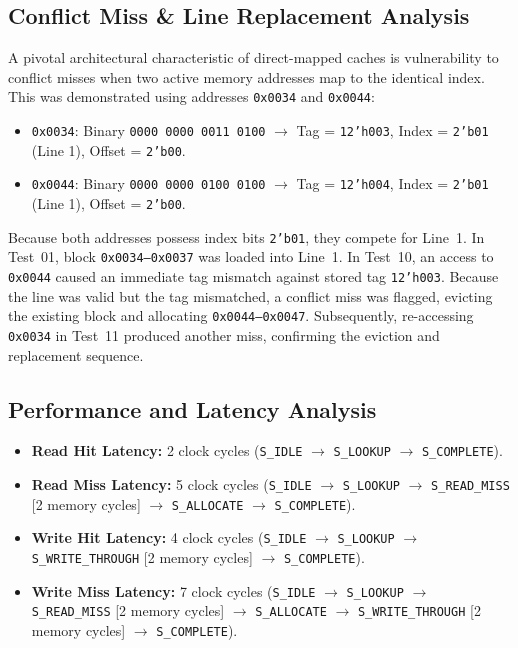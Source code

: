 \documentclass[conference]{IEEEtran}
\begin{document}
\subsection{Conflict Miss \& Line Replacement Analysis}
A pivotal architectural characteristic of direct-mapped caches is vulnerability to conflict misses when two active memory addresses map to the identical index. This was demonstrated using addresses \texttt{0x0034} and \texttt{0x0044}:
\begin{itemize}
    \item \texttt{0x0034}: Binary \texttt{0000 0000 0011 0100} $\rightarrow$ Tag = \texttt{12'h003}, Index = \texttt{2'b01} (Line 1), Offset = \texttt{2'b00}.
    \item \texttt{0x0044}: Binary \texttt{0000 0000 0100 0100} $\rightarrow$ Tag = \texttt{12'h004}, Index = \texttt{2'b01} (Line 1), Offset = \texttt{2'b00}.
\end{itemize}

Because both addresses possess index bits \texttt{2'b01}, they compete for Line~1. In Test~01, block \texttt{0x0034--0x0037} was loaded into Line~1. In Test~10, an access to \texttt{0x0044} caused an immediate tag mismatch against stored tag \texttt{12'h003}. Because the line was valid but the tag mismatched, a conflict miss was flagged, evicting the existing block and allocating \texttt{0x0044--0x0047}. Subsequently, re-accessing \texttt{0x0034} in Test~11 produced another miss, confirming the eviction and replacement sequence.

\subsection{Performance and Latency Analysis}
\begin{itemize}
    \item \textbf{Read Hit Latency:} 2 clock cycles (\texttt{S\_IDLE} $\rightarrow$ \texttt{S\_LOOKUP} $\rightarrow$ \texttt{S\_COMPLETE}).
    \item \textbf{Read Miss Latency:} 5 clock cycles (\texttt{S\_IDLE} $\rightarrow$ \texttt{S\_LOOKUP} $\rightarrow$ \texttt{S\_READ\_MISS} [2 memory cycles] $\rightarrow$ \texttt{S\_ALLOCATE} $\rightarrow$ \texttt{S\_COMPLETE}).
    \item \textbf{Write Hit Latency:} 4 clock cycles (\texttt{S\_IDLE} $\rightarrow$ \texttt{S\_LOOKUP} $\rightarrow$ \texttt{S\_WRITE\_THROUGH} [2 memory cycles] $\rightarrow$ \texttt{S\_COMPLETE}).
    \item \textbf{Write Miss Latency:} 7 clock cycles (\texttt{S\_IDLE} $\rightarrow$ \texttt{S\_LOOKUP} $\rightarrow$ \texttt{S\_READ\_MISS} [2 memory cycles] $\rightarrow$ \texttt{S\_ALLOCATE} $\rightarrow$ \texttt{S\_WRITE\_THROUGH} [2 memory cycles] $\rightarrow$ \texttt{S\_COMPLETE}).
\end{itemize}
\end{document}
